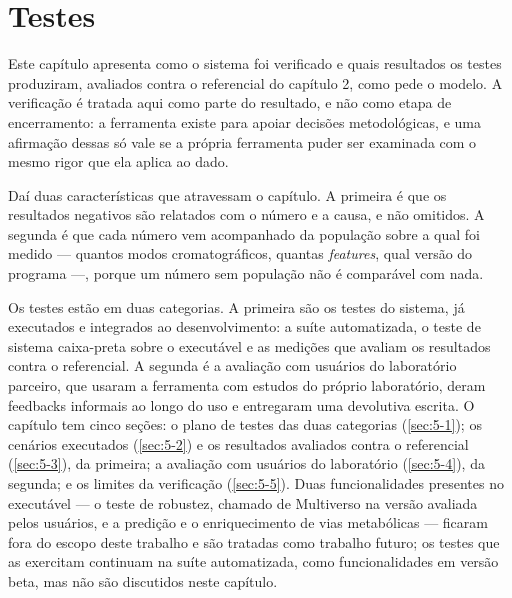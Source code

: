 
\begingroup\setlength{\emergencystretch}{3em}

\chapter{Testes}\label{cap:testes}

Este capítulo apresenta como o sistema foi verificado e quais resultados os testes produziram, avaliados contra o referencial do capítulo 2, como pede o modelo. A verificação é tratada aqui como parte do resultado, e não como etapa de encerramento: a ferramenta existe para apoiar decisões metodológicas, e uma afirmação dessas só vale se a própria ferramenta puder ser examinada com o mesmo rigor que ela aplica ao dado.

Daí duas características que atravessam o capítulo. A primeira é que os resultados negativos são relatados com o número e a causa, e não omitidos. A segunda é que cada número vem acompanhado da população sobre a qual foi medido --- quantos modos cromatográficos, quantas \textit{features}, qual versão do programa ---, porque um número sem população não é comparável com nada.

Os testes estão em duas categorias. A primeira são os testes do sistema, já executados e integrados ao desenvolvimento: a suíte automatizada, o teste de sistema caixa-preta sobre o executável e as medições que avaliam os resultados contra o referencial. A segunda é a avaliação com usuários do laboratório parceiro, que usaram a ferramenta com estudos do próprio laboratório, deram feedbacks informais ao longo do uso e entregaram uma devolutiva escrita. O capítulo tem cinco seções: o plano de testes das duas categorias (\ref{sec:5-1}); os cenários executados (\ref{sec:5-2}) e os resultados avaliados contra o referencial (\ref{sec:5-3}), da primeira; a avaliação com usuários do laboratório (\ref{sec:5-4}), da segunda; e os limites da verificação (\ref{sec:5-5}). Duas funcionalidades presentes no executável --- o teste de robustez, chamado de Multiverso na versão avaliada pelos usuários, e a predição e o enriquecimento de vias metabólicas --- ficaram fora do escopo deste trabalho e são tratadas como trabalho futuro; os testes que as exercitam continuam na suíte automatizada, como funcionalidades em versão beta, mas não são discutidos neste capítulo.

